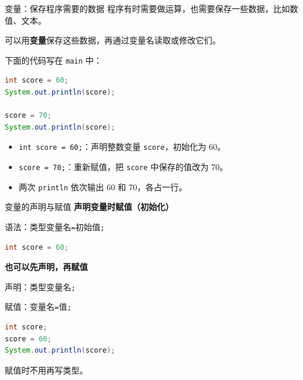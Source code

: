 \documentclass[aspectratio=169]{beamer}
\begin{document}
\begin{frame}[fragile]{变量：保存程序需要的数据}
  程序有时需要做运算，也需要保存一些数据，比如数值、文本。
  \par\medskip
  可以用\textbf{变量}保存这些数据，再通过变量名读取或修改它们。
  \par\medskip
  下面的代码写在 \texttt{main} 中：
  \begin{lstlisting}[language=Java]
int score = 60;
System.out.println(score);

score = 70;
System.out.println(score);
  \end{lstlisting}
  \begin{itemize}
    \item \texttt{int score = 60;}：声明整数变量 \texttt{score}，初始化为 60。
    \item \texttt{score = 70;}：重新赋值，把 \texttt{score} 中保存的值改为 70。
    \item 两次 \texttt{println} 依次输出 60 和 70，各占一行。
  \end{itemize}
\end{frame}

\begin{frame}[fragile]{变量的声明与赋值}
  \textbf{声明变量时赋值（初始化）}
  \par
  语法：\quad 类型\quad 变量名\quad \texttt{=}\quad 初始值\texttt{;}
  \begin{lstlisting}[language=Java]
int score = 60;
  \end{lstlisting}
  \medskip
  \textbf{也可以先声明，再赋值}
  \par
  声明：\quad 类型\quad 变量名\texttt{;}
  \par
  赋值：\quad 变量名\quad \texttt{=}\quad 值\texttt{;}
  \begin{lstlisting}[language=Java]
int score;
score = 60;
System.out.println(score);
  \end{lstlisting}
  赋值时不用再写类型。
\end{frame}
\end{document}
